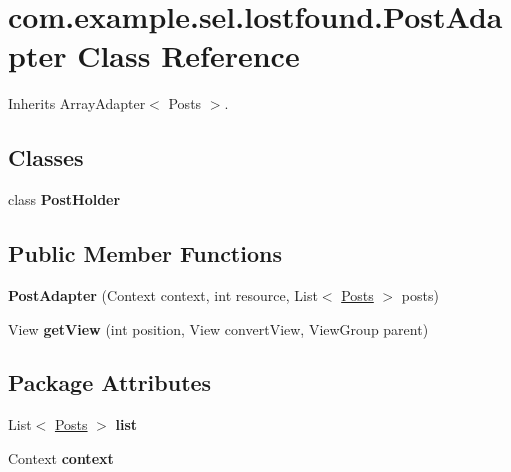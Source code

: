\hypertarget{classcom_1_1example_1_1sel_1_1lostfound_1_1PostAdapter}{\section{com.\-example.\-sel.\-lostfound.\-Post\-Adapter \-Class \-Reference}
\label{classcom_1_1example_1_1sel_1_1lostfound_1_1PostAdapter}
}


\-Inherits \-Array\-Adapter$<$ Posts $>$.

\subsection*{\-Classes}
\begin{DoxyCompactItemize}
\item 
class {\bfseries \-Post\-Holder}
\end{DoxyCompactItemize}
\subsection*{\-Public \-Member \-Functions}
\begin{DoxyCompactItemize}
\item 
\hypertarget{classcom_1_1example_1_1sel_1_1lostfound_1_1PostAdapter_a58de5e8d3132dd70bfd35dcb44bf80e1}{{\bfseries \-Post\-Adapter} (\-Context context, int resource, \-List$<$ \hyperlink{classcom_1_1example_1_1sel_1_1lostfound_1_1Posts}{\-Posts} $>$ posts)}\label{classcom_1_1example_1_1sel_1_1lostfound_1_1PostAdapter_a58de5e8d3132dd70bfd35dcb44bf80e1}

\item 
\hypertarget{classcom_1_1example_1_1sel_1_1lostfound_1_1PostAdapter_aa2f3c1364857d97091ba325de3df6226}{\-View {\bfseries get\-View} (int position, \-View convert\-View, \-View\-Group parent)}\label{classcom_1_1example_1_1sel_1_1lostfound_1_1PostAdapter_aa2f3c1364857d97091ba325de3df6226}

\end{DoxyCompactItemize}
\subsection*{\-Package \-Attributes}
\begin{DoxyCompactItemize}
\item 
\hypertarget{classcom_1_1example_1_1sel_1_1lostfound_1_1PostAdapter_ab63de5ae17faa64acb6d9e9659f31b70}{\-List$<$ \hyperlink{classcom_1_1example_1_1sel_1_1lostfound_1_1Posts}{\-Posts} $>$ {\bfseries list}}\label{classcom_1_1example_1_1sel_1_1lostfound_1_1PostAdapter_ab63de5ae17faa64acb6d9e9659f31b70}

\item 
\hypertarget{classcom_1_1example_1_1sel_1_1lostfound_1_1PostAdapter_aa29b3df2bb916b5101261b51a1713b1a}{\-Context {\bfseries context}}\label{classcom_1_1example_1_1sel_1_1lostfound_1_1PostAdapter_aa29b3df2bb916b5101261b51a1713b1a}

\end{DoxyCompactItemize}


